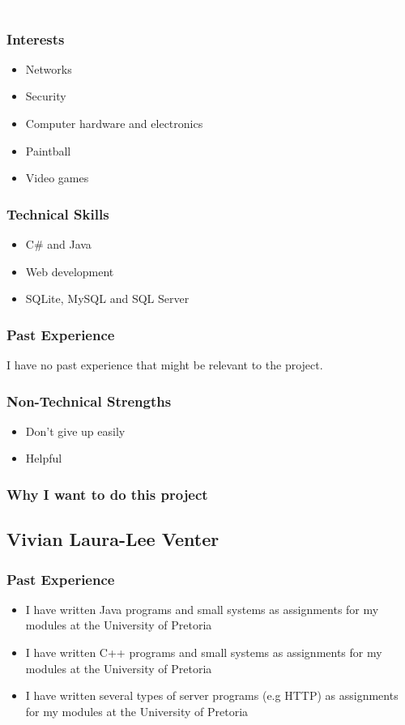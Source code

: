 \textcolor{white}{.}
\subsubsection{Interests}
	\begin{itemize}
		\item Networks
		\item Security
		\item Computer hardware and electronics
		\item Paintball
		\item Video games
	\end{itemize}
\subsubsection{Technical Skills} 
	\begin{itemize}
		\item C\# and Java
		\item Web development
		\item SQLite, MySQL and SQL Server
	\end{itemize}
\subsubsection{Past Experience}
I have no past experience that might be relevant to the project. %
\subsubsection{Non-Technical Strengths}
	\begin{itemize}
		\item Don't give up easily
		\item Helpful
	\end{itemize}
\subsubsection{Why I want to do this project} 

\pagebreak
\subsection{Vivian Laura-Lee Venter}

\subsubsection{Past Experience} 
\begin{itemize}
	\item{I have written Java programs and small systems as assignments for my modules at the University of Pretoria}
	\item{I have written C++ programs and small systems as assignments for my modules at the University of Pretoria}
	\item{I have written several types of server programs (e.g HTTP) as assignments for my modules at the University of Pretoria}
\end{itemize}
